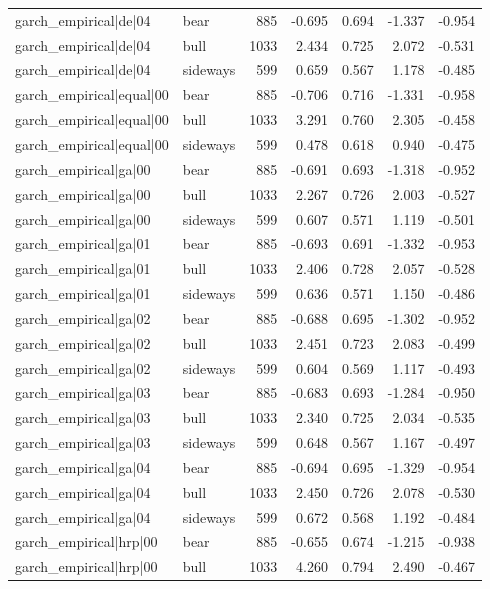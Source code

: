 \begin{table}
\begin{tabular}{llrrrrr}
garch\_empirical|de|04 & bear & 885 & -0.695 & 0.694 & -1.337 & -0.954 \\
garch\_empirical|de|04 & bull & 1033 & 2.434 & 0.725 & 2.072 & -0.531 \\
garch\_empirical|de|04 & sideways & 599 & 0.659 & 0.567 & 1.178 & -0.485 \\
garch\_empirical|equal|00 & bear & 885 & -0.706 & 0.716 & -1.331 & -0.958 \\
garch\_empirical|equal|00 & bull & 1033 & 3.291 & 0.760 & 2.305 & -0.458 \\
garch\_empirical|equal|00 & sideways & 599 & 0.478 & 0.618 & 0.940 & -0.475 \\
garch\_empirical|ga|00 & bear & 885 & -0.691 & 0.693 & -1.318 & -0.952 \\
garch\_empirical|ga|00 & bull & 1033 & 2.267 & 0.726 & 2.003 & -0.527 \\
garch\_empirical|ga|00 & sideways & 599 & 0.607 & 0.571 & 1.119 & -0.501 \\
garch\_empirical|ga|01 & bear & 885 & -0.693 & 0.691 & -1.332 & -0.953 \\
garch\_empirical|ga|01 & bull & 1033 & 2.406 & 0.728 & 2.057 & -0.528 \\
garch\_empirical|ga|01 & sideways & 599 & 0.636 & 0.571 & 1.150 & -0.486 \\
garch\_empirical|ga|02 & bear & 885 & -0.688 & 0.695 & -1.302 & -0.952 \\
garch\_empirical|ga|02 & bull & 1033 & 2.451 & 0.723 & 2.083 & -0.499 \\
garch\_empirical|ga|02 & sideways & 599 & 0.604 & 0.569 & 1.117 & -0.493 \\
garch\_empirical|ga|03 & bear & 885 & -0.683 & 0.693 & -1.284 & -0.950 \\
garch\_empirical|ga|03 & bull & 1033 & 2.340 & 0.725 & 2.034 & -0.535 \\
garch\_empirical|ga|03 & sideways & 599 & 0.648 & 0.567 & 1.167 & -0.497 \\
garch\_empirical|ga|04 & bear & 885 & -0.694 & 0.695 & -1.329 & -0.954 \\
garch\_empirical|ga|04 & bull & 1033 & 2.450 & 0.726 & 2.078 & -0.530 \\
garch\_empirical|ga|04 & sideways & 599 & 0.672 & 0.568 & 1.192 & -0.484 \\
garch\_empirical|hrp|00 & bear & 885 & -0.655 & 0.674 & -1.215 & -0.938 \\
garch\_empirical|hrp|00 & bull & 1033 & 4.260 & 0.794 & 2.490 & -0.467 \\

\end{tabular}
\end{table}
